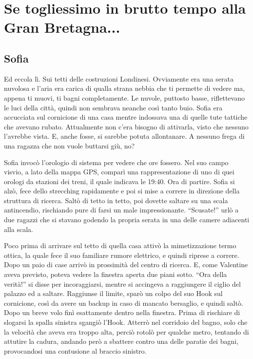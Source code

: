 \chapter{Se togliessimo in brutto tempo alla Gran Bretagna...}

  \section*{Sofia}
    
    Ed eccola lì. Sui tetti delle costruzioni Londinesi. Ovviamente era una serata nuvolosa e l'aria era carica di qualla
    strana nebbia che ti permette di vedere ma, appena ti muovi, ti bagni completamente. Le nuvole, puttosto basse,
    riflettevano le luci della città, quindi non sembrava neanche così tanto buio. Sofia era accucciata sul
    cornicione di una casa mentre indossava una di quelle tute tattiche che avevano rubato. Attualmente non c'era
    bisogno di attivarla, visto che nessuno l'avrebbe vista. E, anche fosse, si sarebbe potuta allontanare. A nessuno
    frega di una ragazza che non vuole buttarsi giù, no?

    Sofia invocò l'orologio di sistema per vedere che ore fossero. Nel suo campo visvio, a lato della mappa GPS, comparì
    una rappresentazione di uno di quei orologi da stazioni dei treni, il quale indicava le 19:40. Ora di partire. Sofia
    si alzò, fece dello strecching rapidamente e poi si mise a correre in direzione della struttura di ricerca. Saltò di
    tetto in tetto, poi dovette saltare su una scala antincendio, rischiando pure di farsi un male impressionante.
    ``Scusate!'' urlò a due ragazzi che si stavano godendo la propria serata in una delle camere adiacenti alla scala.

    Poco prima di arrivare sul tetto di quella casa attivò la mimetizzazione termo ottica, la quale fece il suo
    familiare rumore elettrico, e quindi riprese a correre. Dopo un paio di case arrivò in prossimità del centro di
    ricerca. E, come Valentine aveva previsto, poteva vedere la finestra aperta due piani sotto. ``Ora della verità!''
    si disse per incoraggiarsi, mentre si accingeva a raggiungere il ciglio del palazzo ed a saltare. Raggiunse il
    limite, sparò un colpo del suo Hook sul cornicione, così da avere un backup in caso di mancato bersaglio, e quindi
    saltò. Dopo un breve volo finì esattamente dentro nella finestra. Prima di rischiare di slogarsi la spalla sinistra
    sgangiò l'Hook. Atterrò nel corridoio del bagno, solo che la velocità che aveva era troppo alta, perciò rotolò per
    qualche metro, tentando di attutire la cadura, andando però a sbattere contro una delle paratie dei bagni,
    provocandosi una contusione al braccio sinistro.

